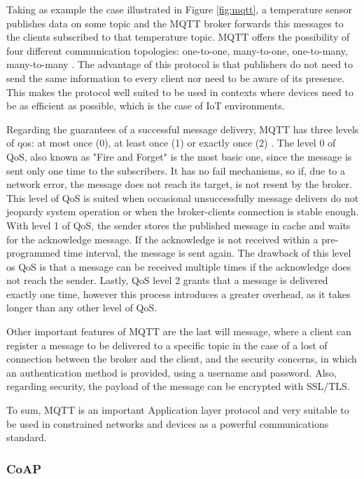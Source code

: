 Taking as example the case illustrated in Figure \ref{fig:mqtt}, a temperature sensor publishes data on some topic and the MQTT broker forwards this messages to the clients subscribed to that temperature topic. MQTT offers the possibility of four different communication topologies: one-to-one, many-to-one, one-to-many, many-to-many \cite{Chen2016}. The advantage of this protocol is that publishers do not need to send the same information to every client nor need to be aware of its presence. This makes the protocol well suited to be used in contexts where devices need to be as efficient as possible, which is the case of IoT environments.

Regarding the guarantees of a successful message delivery, MQTT has three levels of \acf{qos}: at most once (0), at least once (1) or exactly once (2) \cite{mqtt_qos}. The level 0 of QoS, also known as "Fire and Forget" is the most basic one, since the message is sent only one time to the subscribers. It has no fail mechanisms, so if, due to a network error, the message does not reach its target, is not resent by the broker. This level of QoS is suited when occasional unsuccessfully message delivers do not jeopardy system operation or when the broker-clients connection is stable enough. With level 1 of QoS, the sender stores the published message in cache and waits for the acknowledge message. If the acknowledge is not received within a pre-programmed time interval, the message is sent again. The drawback of this level os QoS is that a message can be received multiple times if the acknowledge does not reach the sender. Lastly, QoS level 2 grants that a message is delivered exactly one time, however this process introduces a greater overhead, as it takes longer than any other level of QoS.

Other important features of MQTT are the last will message, where a client can register a message to be delivered to a specific topic in the case of a lost of connection between the broker and the client, and the security concerns, in which an authentication method is provided, using a username and password. Also, regarding security, the payload of the message can be encrypted with SSL/TLS.

To sum, MQTT is an important Application layer protocol and very suitable to be used in constrained networks and devices as a powerful communications standard.

\subsubsection{CoAP}

